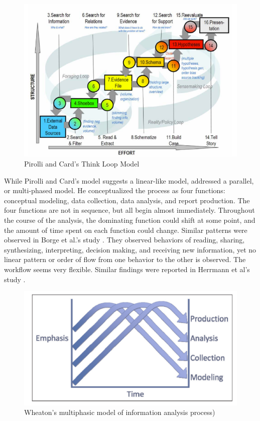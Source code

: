 \begin{figure}
	\centering
	\includegraphics[width=.8\columnwidth]{02-Literature/img/pirolli.png}
	\caption{Pirolli and Card's Think Loop Model \label{fig:pirolli}}
\end{figure}

While Pirolli and Card's model suggests a linear-like model, \cite{Wheaton2011} addressed a 
parallel, or multi-phased model. He conceptualized the process as four functions: conceptual modeling, data collection, data analysis, and report production. The four functions are not in sequence, but all begin almost immediately. Throughout the course of the analysis, the dominating function could shift at some point, and the amount of time spent on each function could change. Similar patterns were observed in Borge et al.'s study \citeyearpar{Borge2012}. They observed behaviors of reading, sharing, synthesizing, interpreting, decision making, and receiving new information, yet no linear pattern or order of flow from one behavior to the other is observed. The workflow seems very flexible. Similar findings were reported in Herrmann et al's study \citeyearpar{Herrmann2013a}.

\begin{figure}
	\centering
	\includegraphics[width=\columnwidth]{02-Literature/img/wheaton.png}
	\caption{Wheaton's multiphasic model of information analysis process)\label{fig:wheaton}}
\end{figure}

